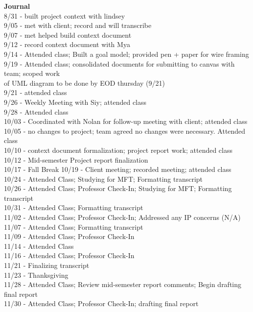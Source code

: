 \documentclass[oneside,openany,obeyspaces]{book}
\newcommand\tab[1][1cm]{\hspace*{#1}}
\begin{document}
\begin{flushleft}
    \textbf{Journal\\}
    8/31 - built project context with lindsey\\
    9/05 - met with client; record and will transcribe\\
    9/07 - met helped build context document\\
    9/12 - record context document with Mya\\
    9/14 - Attended class; Built a goal model; provided pen + paper for wire framing\\
    9/19 - Attended class; consolidated documents for submitting to canvas with team; scoped work\\
    \tab of UML diagram to be done by EOD thursday (9/21)\\
    9/21 - attended class\\
    9/26 - Weekly Meeting with Siy; attended class\\
    9/28 - Attended class\\
    10/03 - Coordinated with Nolan for follow-up meeting with client; attended class\\
    10/05 - no changes to project; team agreed no changes were necessary. Attended class\\
    10/10 - context document formalization; project report work; attended class\\
    10/12 - Mid-semester Project report finalization\\
    10/17 - Fall Break
    10/19 - Client meeting; recorded meeting; attended class\\
    10/24 - Attended Class; Studying for MFT; Formatting transcript\\
    10/26 - Attended Class; Professor Check-In; Studying for MFT; Formatting transcript\\
    10/31 - Attended Class; Formatting transcript\\
    11/02 - Attended Class; Professor Check-In; Addressed any IP concerns (N/A)\\
    11/07 - Attended Class; Formatting transcript\\
    11/09 - Attended Class; Professor Check-In\\
    11/14 - Attended Class\\
    11/16 - Attended Class; Professor Check-In\\
    11/21 - Finalizing transcript \\
    11/23 - Thanksgiving \\
    11/28 - Attended Class; Review mid-semester report comments; Begin drafting final report \\
    11/30 - Attended Class; Professor Check-In; drafting final report \\~\\


\end{flushleft}
\end{document}
